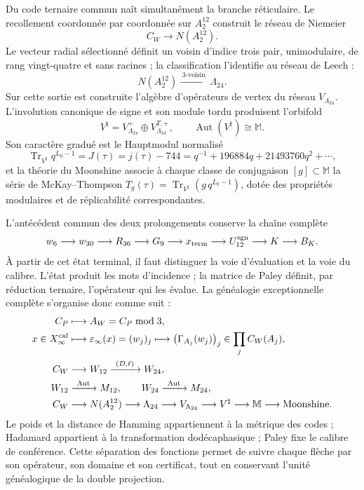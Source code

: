 Du code ternaire commun naît simultanément la branche réticulaire. Le
recollement coordonnée par coordonnée sur \(A_2^{12}\) construit le réseau de
Niemeier
\[
 C_W\longrightarrow N(A_2^{12}).
\]
Le vecteur radial sélectionné définit un voisin d'indice trois pair,
unimodulaire, de rang vingt-quatre et sans racines ; la classification l'identifie
au réseau de Leech :
\[
 N(A_2^{12})\xrightarrow{\;3\text{-voisin}\;}\Lambda_{24}.
\]
Sur cette sortie est construite l'algèbre d'opérateurs de vertex du réseau
\(V_{\Lambda_{24}}\). L'involution canonique de signe et son module tordu
produisent l'orbifold
\[
 V^\natural=V_{\Lambda_{24}}^+
 \oplus V_{\Lambda_{24}}^{T,+},
 \qquad
 \operatorname{Aut}(V^\natural)\cong\mathbb M.
\]
Son caractère gradué est le Hauptmodul normalisé
\[
 \operatorname{Tr}_{V^\natural}q^{L_0-1}
 =J(\tau)=j(\tau)-744
 =q^{-1}+196884q+21493760q^2+\cdots,
\]
et la théorie du Moonshine associe à chaque classe de conjugaison
\([g]\subset\mathbb M\) la série de McKay--Thompson
\(T_g(\tau)=\operatorname{Tr}_{V^\natural}
(g\,q^{L_0-1})\), dotée des propriétés modulaires et de réplicabilité
correspondantes.

L'antécédent commun des deux prolongements conserve la chaîne complète
\[
 w_6\longrightarrow w_{30}\longrightarrow R_{36}\longrightarrow G_9
 \longrightarrow x_{\rm term}\longrightarrow U_{12}^{\rm sgn}
 \longrightarrow K\longrightarrow B_K.
\]
À partir de cet état terminal, il faut distinguer la voie d'évaluation et la voie
du calibre. L'état produit les mots d'incidence ; la matrice de Paley
définit, par réduction ternaire, l'opérateur qui les évalue. La généalogie
exceptionnelle complète s'organise donc comme suit :
\[
\begin{aligned}
C_P&\longmapsto A_W=C_P\bmod3,\\
x\in X_\infty^{\rm cal}
&\longmapsto \varepsilon_\infty(x)=(w_j)_j
 \longmapsto\bigl(\Gamma_{A_j}(w_j)\bigr)_j
 \in\prod_j C_W(A_j),\\
C_W
&\longrightarrow W_{12}\xrightarrow{\ (D,\ell)\ }W_{24},\\
W_{12}&\xrightarrow{\ \operatorname{Aut}\ }M_{12},
\qquad W_{24}\xrightarrow{\ \operatorname{Aut}\ }M_{24},\\
C_W
&\longrightarrow N(A_2^{12})\longrightarrow\Lambda_{24}
 \longrightarrow V_{\Lambda_{24}}\longrightarrow V^\natural
 \longrightarrow\mathbb M\longrightarrow\text{Moonshine}.
\end{aligned}
\]
Le poids et la distance de Hamming appartiennent à la métrique des codes ;
Hadamard appartient à la transformation dodécaphasique ; Paley fixe le calibre
de conférence. Cette séparation des fonctions permet de suivre chaque flèche par
son opérateur, son domaine et son certificat, tout en conservant l'unité
généalogique de la double projection.
